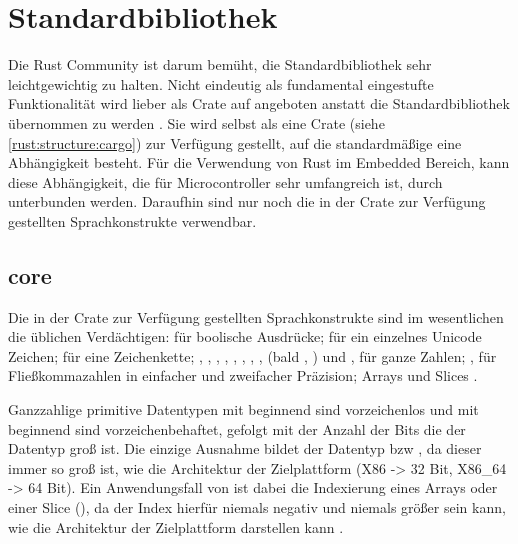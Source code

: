 \section{Standardbibliothek}
\label{rust:stdlib}

Die Rust Community ist darum bemüht, die Standardbibliothek sehr leichtgewichtig zu halten.
Nicht eindeutig als fundamental eingestufte Funktionalität wird lieber als Crate auf  angeboten anstatt die Standardbibliothek übernommen zu werden . 
Sie wird selbst als eine Crate (siehe \autoref{rust:structure:cargo}) zur Verfügung gestellt, auf die standardmäßige eine Abhängigkeit besteht.
Für die Verwendung von Rust im Embedded Bereich, kann diese Abhängigkeit, die für Microcontroller sehr umfangreich ist, durch \rustcinline{#![no_std]} unterbunden werden.
Daraufhin sind nur noch die in der  Crate zur Verfügung gestellten Sprachkonstrukte verwendbar.

\subsection{core}
\label{rust:core}
Die in der  Crate zur Verfügung gestellten Sprachkonstrukte sind im wesentlichen die üblichen  Verdächtigen:  für boolische Ausdrücke;  für ein einzelnes Unicode Zeichen;  für eine Zeichenkette; , , , , , , , , (bald ,  ) und ,   für ganze Zahlen; ,  für Fließkommazahlen in einfacher und zweifacher Präzision; Arrays und Slices \cite{rust:book:primitives}.

Ganzzahlige primitive Datentypen mit  beginnend sind vorzeichenlos und mit  beginnend sind vorzeichenbehaftet, gefolgt mit der Anzahl der Bits  die der Datentyp groß ist.
 Die einzige Ausnahme bildet der Datentyp  bzw , da dieser immer so groß ist, wie die Architektur der Zielplattform (X86 -> 32 Bit, X86\_64 -> 64 Bit).
Ein Anwendungsfall von  ist dabei die Indexierung eines Arrays oder einer Slice (), da der Index hierfür niemals negativ und niemals größer sein kann, wie die Architektur der Zielplattform darstellen kann .

